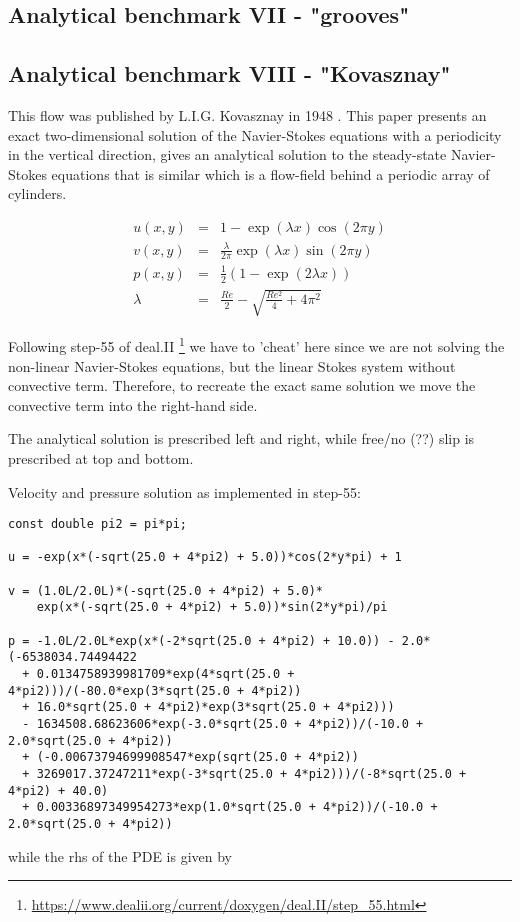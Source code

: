 \subsection{Analytical benchmark VII \label{mms7} - "grooves"}


\subsection{Analytical benchmark VIII \label{mms8} - "Kovasznay"}

This flow was published by L.I.G. Kovasznay in 1948 \cite{kova48}. 
This paper presents an exact two-dimensional solution of the Navier-Stokes equations 
with a periodicity in the vertical direction, 
gives an analytical solution to the steady-state Navier-Stokes equations that is similar
which is a flow-field behind a periodic array of cylinders.

\begin{eqnarray}
u(x,y)&=&1-\exp(\lambda x) \cos (2\pi y)\\
v(x,y)&=&\frac{\lambda}{2\pi} \exp(\lambda x) \sin (2 \pi y)\\
p(x,y) &=& \frac{1}{2}(1-\exp (2\lambda x)) \\
\lambda&=&\frac{Re}{2}-\sqrt{\frac{Re^2}{4}+4\pi^2} 
\end{eqnarray}

Following step-55 of deal.II \footnote{\url{https://www.dealii.org/current/doxygen/deal.II/step_55.html}}
we have to 'cheat' here since we are not solving the non-linear Navier-Stokes equations, but the linear Stokes system without convective term. Therefore, to recreate the exact same solution
we move the convective term into the right-hand side.

The analytical solution is prescribed left and right, while free/no (??) slip is prescribed at top and bottom.

Velocity and pressure solution as implemented in step-55:
\begin{lstlisting}
const double pi2 = pi*pi;

u = -exp(x*(-sqrt(25.0 + 4*pi2) + 5.0))*cos(2*y*pi) + 1

v = (1.0L/2.0L)*(-sqrt(25.0 + 4*pi2) + 5.0)*
    exp(x*(-sqrt(25.0 + 4*pi2) + 5.0))*sin(2*y*pi)/pi

p = -1.0L/2.0L*exp(x*(-2*sqrt(25.0 + 4*pi2) + 10.0)) - 2.0*(-6538034.74494422 
  + 0.0134758939981709*exp(4*sqrt(25.0 + 4*pi2)))/(-80.0*exp(3*sqrt(25.0 + 4*pi2)) 
  + 16.0*sqrt(25.0 + 4*pi2)*exp(3*sqrt(25.0 + 4*pi2))) 
  - 1634508.68623606*exp(-3.0*sqrt(25.0 + 4*pi2))/(-10.0 + 2.0*sqrt(25.0 + 4*pi2)) 
  + (-0.00673794699908547*exp(sqrt(25.0 + 4*pi2)) 
  + 3269017.37247211*exp(-3*sqrt(25.0 + 4*pi2)))/(-8*sqrt(25.0 + 4*pi2) + 40.0) 
  + 0.00336897349954273*exp(1.0*sqrt(25.0 + 4*pi2))/(-10.0 + 2.0*sqrt(25.0 + 4*pi2))
\end{lstlisting}
while the rhs of the PDE is given by


